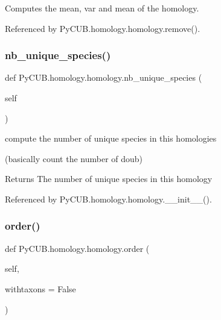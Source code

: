 Computes the mean, var and mean of the homology. 



Referenced by Py\+C\+U\+B.\+homology.\+homology.\+remove().

\mbox{\label{class_py_c_u_b_1_1homology_1_1homology_ad430899a462da76cdd6e1fc6ee73e0ec}} 
\subsubsection{\texorpdfstring{nb\+\_\+unique\+\_\+species()}{nb\_unique\_species()}}
{\footnotesize\ttfamily def Py\+C\+U\+B.\+homology.\+homology.\+nb\+\_\+unique\+\_\+species (\begin{DoxyParamCaption}\item[{}]{self }\end{DoxyParamCaption})}



compute the number of unique species in this homologies 

(basically count the number of doub)

\begin{DoxyReturn}{Returns}
The number of unique species in this homology 
\end{DoxyReturn}


Referenced by Py\+C\+U\+B.\+homology.\+homology.\+\_\+\+\_\+init\+\_\+\+\_\+().

\mbox{\label{class_py_c_u_b_1_1homology_1_1homology_a513d82c775ba47678304c97572eaf932}} 
\subsubsection{\texorpdfstring{order()}{order()}}
{\footnotesize\ttfamily def Py\+C\+U\+B.\+homology.\+homology.\+order (\begin{DoxyParamCaption}\item[{}]{self,  }\item[{}]{withtaxons = {\ttfamily False} }\end{DoxyParamCaption})}



